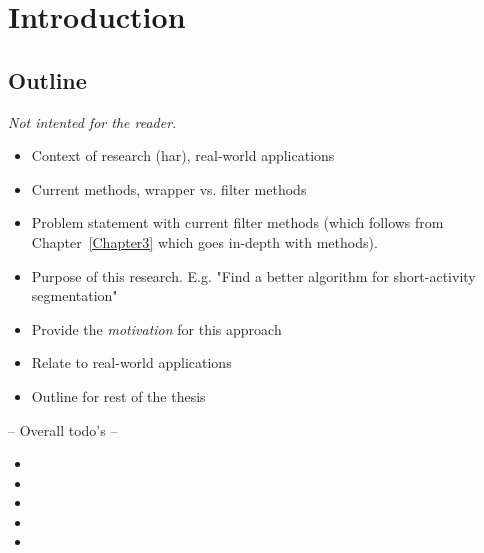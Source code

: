 
\chapter{Introduction}

\label{Chapter1} %



\section{Outline}
\emph{Not intented for the reader.}
\begin{itemize}
  \item Context of research (\gls{har}), real-world applications
  \item Current methods, wrapper vs. filter methods
  \item Problem statement with current filter methods (which follows from Chapter~\ref{Chapter3} which goes in-depth with methods).
  \item Purpose of this research. E.g. "Find a better algorithm for short-activity segmentation"
  \item Provide the \emph{motivation} for this approach
  \item Relate to real-world applications
  \item Outline for rest of the thesis
\end{itemize}

-- Overall todo's --
\begin{itemize}
  \item {}
  \item {}
  \item {}
  \item {}
  \item {}
\end{itemize}